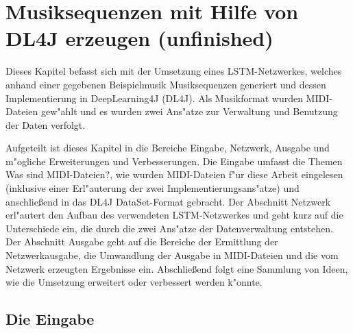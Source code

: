 \chapter{Musiksequenzen mit Hilfe von DL4J erzeugen (unfinished)}
{
Dieses Kapitel befasst sich mit der Umsetzung eines LSTM-Netzwerkes, welches anhand einer gegebenen Beispielmusik Musiksequenzen generiert und dessen Implementierung in DeepLearning4J (DL4J). Als Musikformat wurden MIDI-Dateien gew"ahlt und es wurden zwei Ans"atze zur Verwaltung und Benutzung der Daten verfolgt.

Aufgeteilt ist dieses Kapitel in die Bereiche Eingabe, Netzwerk, Ausgabe und m"ogliche Erweiterungen und Verbesserungen. Die Eingabe umfasst die Themen {\glqq}Was sind MIDI-Dateien?{\grqq}, wie wurden MIDI-Dateien f"ur diese Arbeit eingelesen (inklusive einer Erl"auterung der zwei Implementierungsans"atze) und anschlie{\ss}end in das DL4J DataSet-Format gebracht. Der Abschnitt Netzwerk erl"autert den Aufbau des verwendeten LSTM-Netzwerkes und geht kurz auf die Unterschiede ein, die durch die zwei Ans"atze der Datenverwaltung entstehen. Der Abschnitt Ausgabe geht auf die Bereiche der Ermittlung der Netzwerkausgabe, die Umwandlung der Ausgabe in MIDI-Dateien und die vom Netzwerk erzeugten Ergebnisse ein. Abschlie{\ss}end folgt eine Sammlung von Ideen, wie die Umsetzung erweitert oder verbessert werden k"onnte.


\section{Die Eingabe}

}
